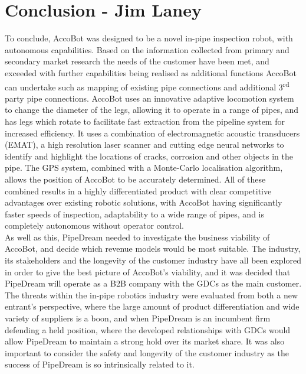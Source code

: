 \documentclass[11pt]{article}		%
\begin{document}
    \section[Conclusion]{Conclusion - Jim Laney}
        
        To conclude, AccoBot was designed to be a novel in-pipe inspection robot, with autonomous capabilities.
        Based on the information collected from primary and secondary market research the needs of the customer have been met, and exceeded with further capabilities being realised as additional functions AccoBot can undertake such as mapping of existing pipe connections and additional 3\textsuperscript{rd} party pipe connections.
        AccoBot uses an innovative adaptive locomotion system to change the diameter of the legs, allowing it to operate in a range of pipes, and has legs which rotate to facilitate fast extraction from the pipeline system for increased efficiency.
        It uses a combination of electromagnetic acoustic transducers (EMAT), a high resolution laser scanner and cutting edge neural networks to identify and highlight the locations of cracks, corrosion and other objects in the pipe.
        The GPS system, combined with a Monte-Carlo localisation algorithm, allows the position of AccoBot to be accurately determined.
        All of these combined results in a highly differentiated product with clear competitive advantages over existing robotic solutions, with AccoBot having significantly faster speeds of inspection, adaptability to a wide range of pipes, and is completely autonomous without operator control. 
        \\ 
        \hspace*{2ex}As well as this, PipeDream needed to investigate the business viability of AccoBot, and decide which revenue models would be most suitable.
        The industry, its stakeholders and the longevity of the customer industry have all been explored in order to give the best picture of AccoBot's viability, and it was decided that PipeDream will operate as a B2B company with the GDCs as the main customer.
        The threats within the in-pipe robotics industry were evaluated from both a new entrant's perspective, where the large amount of product differentiation and wide variety of suppliers is a boon, and when PipeDream is an incumbent firm defending a held position, where the developed relationships with GDCs would allow PipeDream to maintain a strong hold over its market share.
        It was also important to consider the safety and longevity of the customer industry as the success of PipeDream is so intrinsically related to it.
\end{document}
